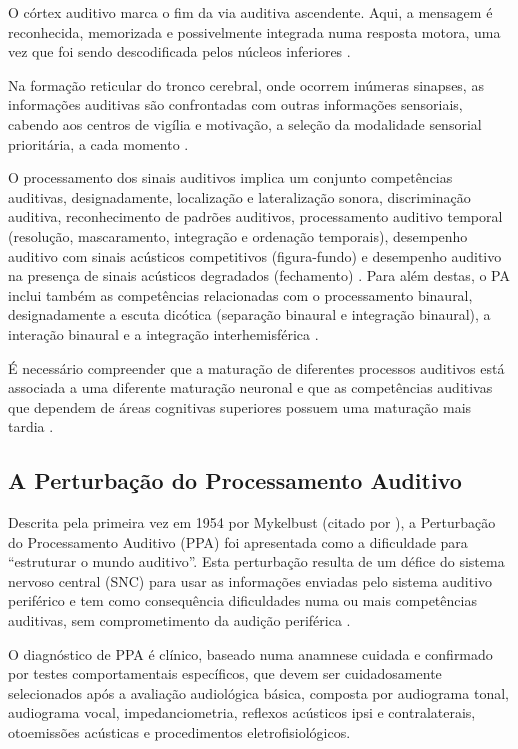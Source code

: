 \documentclass[output=paper,colorlinks,citecolor=brown,booklanguage=portuguese]{langscibook}
\begin{document}
O córtex auditivo marca o fim da via auditiva ascendente. Aqui, a mensagem é reconhecida, memorizada e possivelmente integrada numa resposta motora, uma vez que foi sendo descodificada pelos núcleos inferiores \citep{Pujol2003}.

Na formação reticular do tronco cerebral, onde ocorrem inúmeras sinapses, as informações auditivas são confrontadas com outras informações sensoriais, cabendo aos centros de vigília e motivação, a seleção da modalidade sensorial prioritária, a cada momento \citep{Pujol2003}.

O processamento dos sinais auditivos implica um conjunto competências auditivas, designadamente, localização e lateralização sonora, discriminação auditiva, reconhecimento de padrões auditivos, processamento auditivo temporal (resolução, mascaramento, integração e ordenação temporais), desempenho auditivo com sinais acústicos competitivos (figura-fundo) e desempenho auditivo na presença de sinais acústicos degradados (fechamento) \citep{ASHA1996, Roggia2008, Yathiraj2018}. Para além destas, o PA inclui também as competências relacionadas com o processamento binaural, designadamente a escuta dicótica (separação binaural e integração binaural), a interação binaural e a integração interhemisférica \citep{Ferre2015b}.

É necessário compreender que a maturação de diferentes processos auditivos está associada a uma diferente maturação neuronal e que as competências auditivas que dependem de áreas cognitivas superiores possuem uma maturação mais tardia \citep{Yathiraj2015, Jain2015}.

\subsection{A Perturbação do Processamento Auditivo}
Descrita pela primeira vez em 1954 por Mykelbust (citado por \citealp{BSA2018}), a Perturbação do Processamento Auditivo (PPA) foi apresentada como a dificuldade para “estruturar o mundo auditivo”. Esta perturbação resulta de um défice do sistema nervoso central (SNC) para usar as informações enviadas pelo sistema auditivo periférico e tem como consequência dificuldades numa ou mais competências auditivas, sem comprometimento da audição periférica \citep{ASHA2005a, Bellis2008, Chermak2017, Ferre2015b, Iliadou2017, Koravand2017, Pereira2014}.

O diagnóstico de PPA é clínico, baseado numa anamnese cuidada e confirmado por testes comportamentais específicos, que devem ser cuidadosamente selecionados após a avaliação audiológica básica, composta por audiograma tonal, audiograma vocal, impedanciometria, reflexos acústicos ipsi e contralaterais, otoemissões acústicas e procedimentos eletrofisiológicos.
\end{document}
